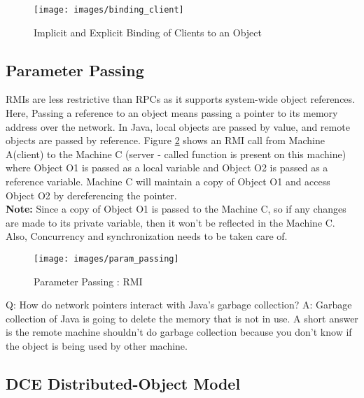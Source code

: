 \documentclass[twoside]{article}
\begin{document}
\begin{figure}[h]
\begin{center}
\texttt{[image: images/binding\_client]}
\caption{Implicit and Explicit Binding of Clients to an Object}
\label{binding_client}
\end{center}
\end{figure}

\subsection{Parameter Passing}

RMIs are less restrictive than RPCs as it supports system-wide object references. Here, Passing a reference to an object means passing a pointer to its memory address over the network. In Java, local objects are passed by value, and remote objects are passed by reference. Figure \ref{passing_param} shows an RMI call from Machine A(client) to the Machine C (server - called function is present on this machine) where Object O1 is passed as a local variable and Object O2 is passed as a reference variable. Machine C will maintain a copy of Object O1 and access Object O2 by dereferencing the pointer. \\
\textbf{Note:} Since a copy of Object O1 is passed to the Machine C, so if any changes are made to its private variable, then it won't be reflected in the Machine C. Also, Concurrency and synchronization needs to be taken care of.

\begin{figure}[h]
\begin{center}
\texttt{[image: images/param\_passing]}
\caption{Parameter Passing : RMI}
\label{passing_param}
\end{center}
\end{figure}

Q: How do network pointers interact with Java's garbage collection?
A: Garbage collection of Java is going to delete the memory that is not in use. A short answer is the remote machine shouldn't do garbage collection because you don't know if the object is being used by other machine.

\subsection{DCE Distributed-Object Model}
\end{document}
